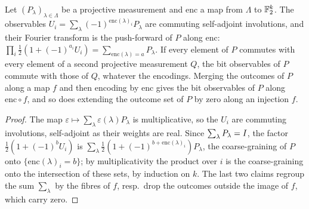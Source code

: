\begin{lemma}
\label{lem:encoded-pvm-obs}
\leanok
Let $(P_\lambda)_{\lambda \in \Lambda}$ be a projective measurement and $\mathrm{enc}$ a map from
$\Lambda$ to $\mathbb{F}_2^k$. The observables $U_i = \sum_\lambda (-1)^{\mathrm{enc}(\lambda)_i}
P_\lambda$ are commuting self-adjoint involutions, and their Fourier transform is the push-forward
of $P$ along $\mathrm{enc}$: $\prod_i \frac12(1 + (-1)^{a_i} U_i) = \sum_{\mathrm{enc}(\lambda) =
a} P_\lambda$. If every element of $P$ commutes with every element of a second projective
measurement $Q$, the bit observables of $P$ commute with those of $Q$, whatever the encodings.
Merging the outcomes of $P$ along a map $f$ and then encoding by $\mathrm{enc}$ gives the bit
observables of $P$ along $\mathrm{enc} \circ f$, and so does extending the outcome set of $P$
by zero along an injection $f$.
\end{lemma}

\begin{proof}
\leanok
The map $\varepsilon \mapsto \sum_\lambda \varepsilon(\lambda) P_\lambda$ is multiplicative, so
the $U_i$ are commuting involutions, self-adjoint as their weights are real. Since $\sum_\lambda
P_\lambda = I$, the factor $\frac12(1 + (-1)^{b} U_i)$ is $\sum_\lambda \frac12(1 +
(-1)^{b + \mathrm{enc}(\lambda)_i}) P_\lambda$, the coarse-graining of $P$ onto
$\{\mathrm{enc}(\lambda)_i = b\}$; by multiplicativity the product over $i$ is the
coarse-graining onto the intersection of these sets, by induction on $k$. The last two claims
regroup the sum $\sum_\lambda$ by the fibres of $f$, resp.\ drop the outcomes outside the
image of $f$, which carry zero.
\end{proof}

